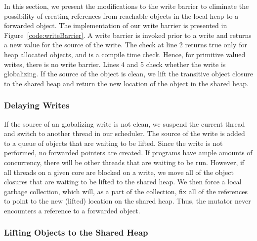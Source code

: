 In this section, we present the modifications to the write barrier to eliminate
the possibility of creating references from reachable objects in the local heap
to a forwarded object. The implementation of our write barrier is presented in
Figure~\ref{code:writeBarrier}. A write barrier is invoked prior to a write and
returns a new value for the source of the write. The check  at
line 2 returns true only for heap allocated objects, and is a compile time
check. Hence, for primitive valued writes, there is no write barrier. Lines 4
and 5 check whether the write is globalizing. If the source of the object is
clean, we lift the transitive object closure to the shared heap and return the
new location of the object in the shared heap.

\subsubsection{Delaying Writes}

If the source of an globalizing write is not clean, we suspend the current thread
and switch to another thread in our scheduler. The source of the write is added
to a queue of objects that are waiting to be lifted. Since the write is not
performed, no forwarded pointers are created. If programs have ample amounts of
concurrency, there will be other threads that are waiting to be run.  However,
if all threads on a given core are blocked on a write, we move all of the
object closures that are waiting to be lifted to the shared heap. We then force
a local garbage collection, which will, as a part of the collection, fix all of
the references to point to the new (lifted) location on the shared heap. Thus,
the mutator never encounters a reference to a forwarded object. \\

\subsubsection{Lifting Objects to the Shared Heap}

